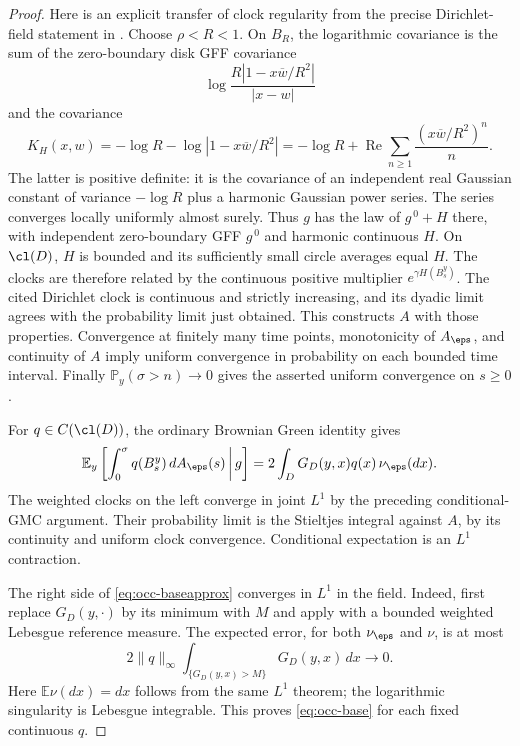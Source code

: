 \begin{proof}
Here is an explicit transfer of clock regularity from the precise
Dirichlet-field statement in \cite[Theorem 1.2, p.~949, proof and
Remark 3.5, p.~959]{berestycki2015diffusion}. Choose $\rho<R<1$. On $B_R$, the
logarithmic covariance is the sum of the zero-boundary disk GFF
covariance
\[
 \log\frac{R|1-x\overline w/R^2|}{|x-w|}
\]
and the covariance
\[
 K_H(x,w)=-\log R-\log|1-x\overline w/R^2|
   =-\log R+
       \operatorname{Re}\sum_{n\geq1}\frac{(x\overline w/R^2)^n}{n}.
\]
The latter is positive definite: it is the covariance of an independent
real Gaussian constant of variance $-\log R$ plus a harmonic Gaussian
power series. The series converges locally uniformly almost surely.
Thus $g$ has the law of $g^{\,0}+H$ there, with independent
zero-boundary GFF $g^{\,0}$ and harmonic continuous $H$.
On $\cl(D)$, $H$ is bounded and its sufficiently small circle averages
equal $H$. The clocks are therefore related by the continuous positive
multiplier $e^{\gamma H(B^y_s)}$. The cited Dirichlet clock is continuous
and strictly increasing, and its dyadic limit agrees with the
probability limit just obtained. This constructs $A$ with those
properties. Convergence at finitely many time points, monotonicity of
$A_\eps$, and continuity of $A$ imply uniform convergence in probability
on each bounded time interval. Finally $\mathbb{P}_y(\sigma>n)\to0$ gives the
asserted uniform convergence on $s\geq0$.

For $q\in C(\cl(D))$, the ordinary Brownian Green identity gives
\begin{equation}\label{eq:occ-baseapprox}
 \mathbb{E}_y\left[\int_0^\sigma q(B^y_s)\,dA_\eps(s)\,\middle|\,g\right]
   =2\int_DG_D(y,x)q(x)\,\nu_\eps(dx).
\end{equation}
The weighted clocks on the left converge in joint $L^1$ by the preceding
conditional-GMC argument. Their probability limit is the Stieltjes
integral against $A$, by its continuity and uniform clock convergence.
Conditional expectation is an $L^1$ contraction.

The right side of \eqref{eq:occ-baseapprox} converges in $L^1$ in the field.
Indeed, first replace $G_D(y,\cdot)$ by its minimum with $M$ and apply
\cite[Theorem 1.1, p.~3]{berestycki2017elementary} with a bounded weighted Lebesgue
reference measure. The expected error, for both $\nu_\eps$ and $\nu$,
is at most
\[
 2\|q\|_\infty
       \int_{\{G_D(y,x)>M\}}G_D(y,x)\,dx\longrightarrow0.
\]
Here $\mathbb{E}\nu(dx)=dx$ follows from the same $L^1$ theorem; the logarithmic
singularity is Lebesgue integrable. This proves \eqref{eq:occ-base}
for each fixed continuous $q$.


\end{proof}
